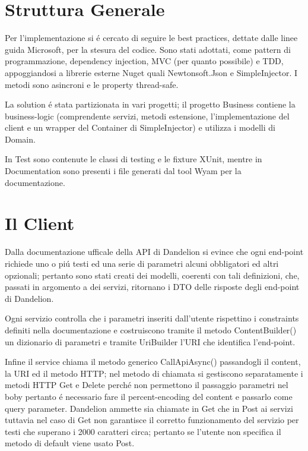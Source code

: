 \section{Struttura Generale}

Per l'implementazione si \'e cercato di seguire le best practices, dettate dalle linee guida Microsoft, per la stesura del codice.
Sono stati adottati, come pattern di programmazione, dependency injection, MVC (per quanto possibile) e TDD, appoggiandosi a librerie esterne Nuget quali 
Newtonsoft.Json e SimpleInjector. I metodi sono asincroni e le property thread-safe.

La solution \'e stata partizionata in vari progetti; il progetto Business contiene la business-logic 
(comprendente servizi, metodi estensione, l'implementazione del client e un wrapper del Container di SimpleInjector) e utilizza i modelli di Domain.

In Test sono contenute le classi di testing e le fixture XUnit, mentre in Documentation sono presenti i file generati dal tool Wyam per la documentazione.

\section{Il Client}

Dalla documentazione ufficale della API di Dandelion si evince che ogni end-point richiede uno o pi\'u testi ed una serie di parametri alcuni obbligatori ed altri 
opzionali; 
pertanto sono stati creati dei modelli, coerenti con tali definizioni, che, passati in argomento a dei servizi, ritornano i DTO delle risposte degli end-point di Dandelion.

Ogni servizio controlla che i parametri inseriti dall'utente rispettino i constraints definiti nella documentazione e costruiscono tramite il metodo ContentBuilder() 
un dizionario di parametri e tramite UriBuilder l'URI che identifica l'end-point. 

Infine il service chiama il metodo generico CallApiAsync() passandogli il content, la URI ed il metodo HTTP; 
nel metodo di chiamata si gestiscono separatamente i metodi HTTP Get e Delete perch\'e non permettono il passaggio parametri nel boby pertanto \'e necessario fare il 
percent-encoding del content e passarlo come query parameter. 
Dandelion ammette sia chiamate in Get che in Post ai servizi tuttavia nel caso di Get non garantisce il corretto 
funzionamento del servizio per testi che superano i 2000 caratteri circa; pertanto se l'utente non specifica il metodo di default viene usato Post.


